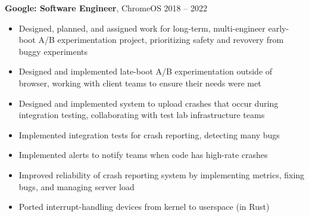\documentclass[margin]{res} \usepackage{hyperref}
\begin{document}
\begin{resume}
  \textbf{Google: Software Engineer}, ChromeOS \hfill 2018 -- 2022
  \begin{minipage}{0.84\textwidth}
    \vspace{0.2em}
    \begin{itemize} \itemsep -1pt
        \item Designed, planned, and assigned work for long-term,
          multi-engineer early-boot A/B experimentation project, prioritizing
          safety and revovery from buggy experiments
       \item Designed and implemented late-boot A/B experimentation outside of
          browser, working with client teams to ensure their needs were met
        \item Designed and implemented system to upload crashes that occur
          during integration testing, collaborating with test lab infrastructure
          teams
        \item Implemented integration tests for crash reporting, detecting many
          bugs
        \item Implemented alerts to notify teams when code has high-rate crashes
        \item Improved reliability of crash reporting system by implementing
          metrics, fixing bugs, and managing server load
        \item Ported interrupt-handling devices from kernel to userspace
          (in Rust)
    \end{itemize}
  \end{minipage}


\end{resume}
\end{document}
